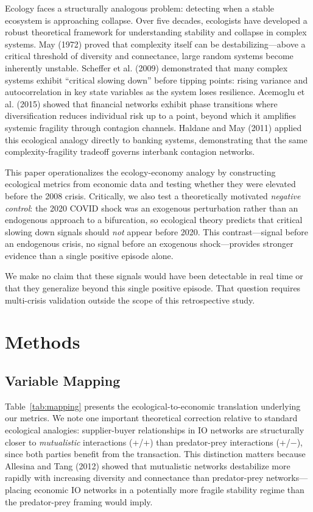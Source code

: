 \documentclass[12pt,a4paper]{article}
\begin{document}
Ecology faces a structurally analogous problem: detecting when a stable ecosystem is
approaching collapse. Over five decades, ecologists have developed a robust theoretical
framework for understanding stability and collapse in complex systems. May (1972)
proved that complexity itself can be destabilizing---above a critical threshold of
diversity and connectance, large random systems become inherently unstable.
Scheffer et al. (2009) demonstrated that many complex systems exhibit ``critical slowing
down'' before tipping points: rising variance and autocorrelation in key state variables
as the system loses resilience. Acemoglu et al. (2015) showed that financial networks
exhibit phase transitions where diversification reduces individual risk up to a point,
beyond which it amplifies systemic fragility through contagion channels.
Haldane and May (2011) applied this ecological analogy directly to banking systems,
demonstrating that the same complexity-fragility tradeoff governs interbank contagion
networks.

This paper operationalizes the ecology-economy analogy by constructing ecological
metrics from economic data and testing whether they were elevated before the 2008
crisis. Critically, we also test a theoretically motivated \textit{negative control}:
the 2020 COVID shock was an exogenous perturbation rather than an endogenous approach
to a bifurcation, so ecological theory predicts that critical slowing down signals
should \textit{not} appear before 2020. This contrast---signal before an endogenous
crisis, no signal before an exogenous shock---provides stronger evidence than a single
positive episode alone.

We make no claim that these signals would have been detectable in real time or that
they generalize beyond this single positive episode. That question requires multi-crisis
validation outside the scope of this retrospective study.

\section{Methods}

\subsection{Variable Mapping}

Table~\ref{tab:mapping} presents the ecological-to-economic translation underlying our
metrics. We note one important theoretical correction relative to standard ecological
analogies: supplier-buyer relationships in IO networks are structurally closer to
\textit{mutualistic} interactions (+/+) than predator-prey interactions (+/$-$), since
both parties benefit from the transaction. This distinction matters because
Allesina and Tang (2012) showed that mutualistic networks destabilize more rapidly with
increasing diversity and connectance than predator-prey networks---placing economic IO
networks in a potentially more fragile stability regime than the predator-prey framing
would imply.
\end{document}
